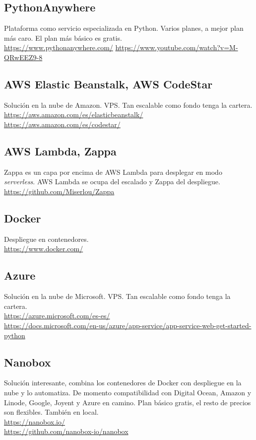 \subsection{PythonAnywhere} 
Plataforma como servicio especializada en Python. Varios planes, a mejor plan más caro. El plan más básico es gratis.\\
\url{https://www.pythonanywhere.com/}
\url{https://www.youtube.com/watch?v=M-QRwEEZ9-8}
\subsection{AWS Elastic Beanstalk,  AWS CodeStar}
Solución en la nube de Amazon. VPS. Tan escalable como fondo tenga la cartera.\\
\url{https://aws.amazon.com/es/elasticbeanstalk/}
\url{https://aws.amazon.com/es/codestar/}
\subsection{AWS Lambda, Zappa}
Zappa es un capa por encima de AWS Lambda para desplegar en modo \textit{serverless}. AWS Lambda se ocupa del escalado y Zappa del despliegue.\\
\url{https://github.com/Miserlou/Zappa}
\subsection{Docker}
Despliegue en contenedores.\\
\url{https://www.docker.com/}
\subsection{Azure}
Solución en la nube de Microsoft. VPS. Tan escalable como fondo tenga la cartera.\\
\url{https://azure.microsoft.com/es-es/}\\
\url{https://docs.microsoft.com/en-us/azure/app-service/app-service-web-get-started-python}
\subsection{Nanobox}
Solución interesante, combina los contenedores de Docker con despliegue en la nube y lo automatiza. De momento compatibilidad con Digital Ocean, Amazon y Linode, Google, Joyent y Azure en camino. Plan básico gratis, el resto de precios son flexibles. También en local.\\
\url{https://nanobox.io/}\\
\url{https://github.com/nanobox-io/nanobox}